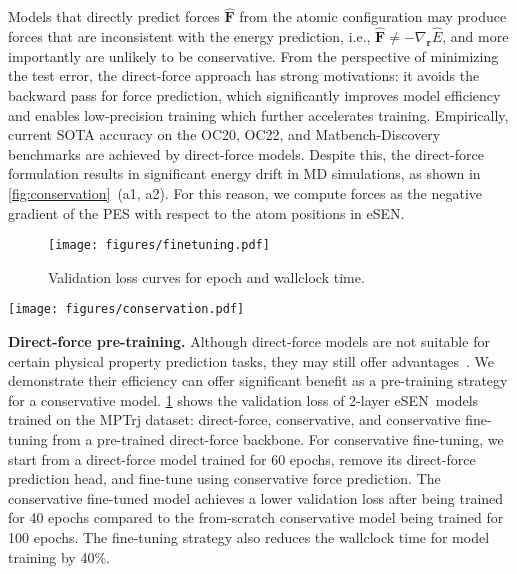\documentclass[twocolumn]{fairmeta}
\newcommand{\ourmodel}{eSEN}
\begin{document}
Models that directly predict forces $\hat{\bm F}$ from the atomic configuration may produce forces that are inconsistent with the energy prediction, i.e., $\hat{\bm F} \neq -\nabla_{\bm r} \hat{E}$, and more importantly are unlikely to be conservative. From the perspective of minimizing the test error, the direct-force approach has strong motivations: it avoids the backward pass for force prediction, which significantly improves model efficiency and enables low-precision training which further accelerates training. Empirically, current SOTA accuracy on the OC20, OC22, and Matbench-Discovery~\citep{oc20, oc22, riebesell2023matbench} benchmarks are achieved by direct-force models. Despite this, the direct-force formulation results in significant energy drift in MD simulations, as shown in \cref{fig:conservation}~(a1, a2). For this reason, we compute forces as the negative gradient
of the PES with respect to the atom positions in \ourmodel.

\begin{figure}[h!]
\texttt{[image: figures/finetuning.pdf]}
\caption{
Validation loss curves for epoch and wallclock time. 
}
\label{fig:finetuning}
\end{figure}


\begin{figure*}[t]
\texttt{[image: figures/conservation.pdf]}
\caption{
Conservation error on the TM23 task (top row) and MD22 task (bottom row) for ablating design choices of \ourmodel. Models that conserve energy are \textbf{bolded} in the legends.
}
\label{fig:conservation}
\end{figure*}

\textbf{Direct-force pre-training.} Although direct-force models are not suitable for certain physical property prediction tasks, they may still offer advantages~\citep{bigi2024dark,amin2025towards}. We demonstrate their efficiency can offer significant benefit as a pre-training strategy for a conservative model. \cref{fig:finetuning} shows the validation loss of 2-layer \ourmodel\ models trained on the MPTrj dataset: direct-force, conservative, and conservative fine-tuning from a pre-trained direct-force backbone. For conservative fine-tuning, we start from a direct-force model trained for 60 epochs, remove its direct-force prediction head, and fine-tune using conservative force prediction. The conservative fine-tuned model achieves a lower validation loss after being trained for 40 epochs compared to the from-scratch conservative model being trained for 100 epochs. The fine-tuning strategy also reduces the wallclock time for model training by 40\%. 
\end{document}
